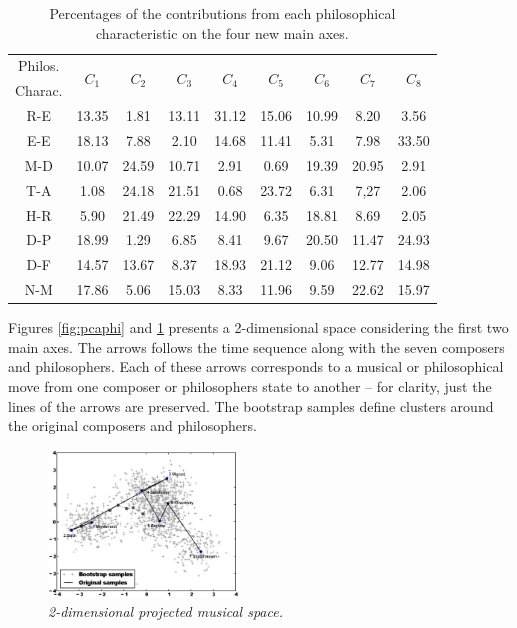 \documentclass[
 aip,
 jmp,
 amsmath,amssymb,
 reprint,
]{revtex4-1}
\begin{document}
\begin{table}%
\caption{\label{tab:Deviatesphi}Percentages of
the contributions from each philosophical characteristic on the four new main axes.  }
\begin{tabular}{|c||c|c|c|c|c|c|c|c|}
\hline
Philos. & \multirow{2}{*}{$C_1$} & \multirow{2}{*}{$C_2$} & \multirow{2}{*}{$C_3$} & \multirow{2}{*}{$C_4$} & \multirow{2}{*}{$C_5$} & \multirow{2}{*}{$C_6$} & \multirow{2}{*}{$C_7$} & \multirow{2}{*}{$C_8$}\\
Charac. & & & & & & & & \\
\hline
R-E & 13.35   &  1.81 & 13.11 & 31.12 & 15.06 & 10.99 &  8.20 &  3.56 \\
E-E & 18.13   &  7.88 &  2.10 & 14.68 & 11.41 &  5.31 &  7.98 & 33.50 \\
M-D & 10.07   & 24.59 & 10.71 &  2.91 &  0.69 & 19.39 & 20.95 &  2.91 \\
T-A &  1.08   & 24.18 & 21.51 &  0.68 & 23.72 &  6.31 &  7,27 &  2.06 \\
H-R &  5.90   & 21.49 & 22.29 & 14.90 &  6.35 & 18.81 &  8.69 &  2.05 \\
D-P & 18.99   &  1.29 &  6.85 &  8.41 &  9.67 & 20.50 & 11.47 & 24.93 \\
D-F & 14.57   & 13.67 &  8.37 & 18.93 & 21.12 &  9.06 & 12.77 & 14.98 \\
N-M & 17.86   &  5.06 & 15.03 &  8.33 & 11.96 &  9.59 & 22.62 & 15.97 \\
\hline

\end{tabular}
\end{table}

Figures \ref{fig:pcaphi} and \ref{fig:pcamus} presents a 2-dimensional space considering the first two main axes. The arrows follows the time sequence along with the seven composers and philosophers. Each of these arrows corresponds to a musical or philosophical move from one composer or philosophers state to another -- for clarity, just the lines of the arrows are preserved. 
The bootstrap samples define clusters around the original composers and philosophers.

\begin{figure}[htbp]
  \begin{center}
    \includegraphics[width=0.45\textwidth]{g1}
  \end{center}
  \caption{\it 2-dimensional projected musical space.}
  \label{fig:pcamus}
\end{figure}
\end{document}
